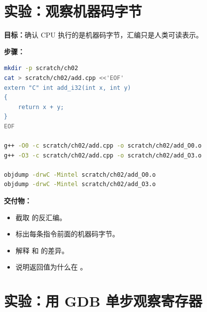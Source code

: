 \section{实验：观察机器码字节}

\begin{labbox}
\textbf{目标：}确认 CPU 执行的是机器码字节，汇编只是人类可读表示。

\textbf{步骤：}

\begin{lstlisting}[language=bash]
mkdir -p scratch/ch02
cat > scratch/ch02/add.cpp <<'EOF'
extern "C" int add_i32(int x, int y)
{
    return x + y;
}
EOF

g++ -O0 -c scratch/ch02/add.cpp -o scratch/ch02/add_O0.o
g++ -O3 -c scratch/ch02/add.cpp -o scratch/ch02/add_O3.o

objdump -drwC -Mintel scratch/ch02/add_O0.o
objdump -drwC -Mintel scratch/ch02/add_O3.o
\end{lstlisting}

\textbf{交付物：}

\begin{itemize}
  \item 截取  的反汇编。
  \item 标出每条指令前面的机器码字节。
  \item 解释  和  的差异。
  \item 说明返回值为什么在 。
\end{itemize}
\end{labbox}

\section{实验：用 GDB 单步观察寄存器}

